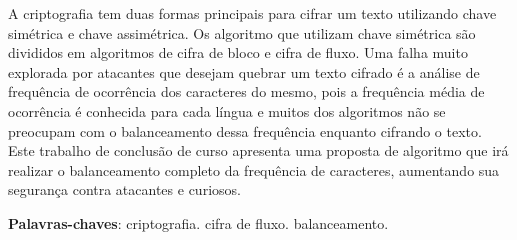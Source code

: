 \begin{resumo}
A criptografia tem duas formas principais para cifrar um texto utilizando chave simétrica e chave assimétrica. Os algoritmo que utilizam chave simétrica são divididos em algoritmos de cifra de bloco e cifra de fluxo. Uma falha muito explorada por atacantes que desejam quebrar um texto cifrado é a análise de frequência de ocorrência dos caracteres do mesmo, pois a frequência média de ocorrência é conhecida para cada língua e muitos dos algoritmos não se preocupam com o balanceamento dessa frequência enquanto cifrando o texto. 
Este trabalho de conclusão de curso apresenta uma proposta de algoritmo que irá realizar o balanceamento completo da frequência de caracteres, aumentando sua segurança contra atacantes e curiosos.

 \vspace{\onelineskip}
    
 \noindent
 \textbf{Palavras-chaves}: criptografia. cifra de fluxo. balanceamento.
\end{resumo}
